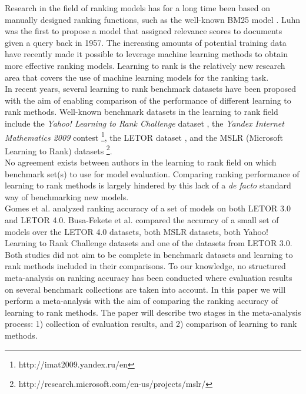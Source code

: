 \documentclass{sig-alternate-2013}
\begin{document}
Research in the field of ranking models has for a long time been based on manually designed ranking functions, such as the well-known BM25 model \cite{Robertson1994}. Luhn \cite{Luhn1957} was the first to propose a model that assigned relevance scores to documents given a query back in 1957. The increasing amounts of potential training data have recently made it possible to leverage machine learning methods to obtain more effective ranking models. Learning to rank is the relatively new research area that covers the use of machine learning models for the ranking task.\\

In recent years, several learning to rank benchmark datasets have been proposed with the aim of enabling comparison of the performance of different learning to rank methods. Well-known benchmark datasets in the learning to rank field include the \emph{Yahoo! Learning to Rank Challenge} dataset \cite{Chapelle2011a}, the \emph{Yandex Internet Mathematics 2009} contest \footnote{http://imat2009.yandex.ru/en}, the LETOR dataset \cite{Qin2010}, and the MSLR (Microsoft Learning to Rank) datasets \footnote{http://research.microsoft.com/en-us/projects/mslr/}.\\

No agreement exists between authors in the learning to rank field on which benchmark set(s) to use for model evaluation. Comparing ranking performance of learning to rank methods is largely hindered by this lack of a \emph{de facto} standard way of benchmarking new models.\\

Gomes et al. \cite{Gomes2013} analyzed ranking accuracy of a set of models on both LETOR 3.0 and LETOR 4.0. Busa-Fekete et al. \cite{Busa-Fekete2013} compared the accuracy of a small set of models over the LETOR 4.0 datasets, both MSLR datasets, both Yahoo! Learning to Rank Challenge datasets and one of the datasets from LETOR 3.0. Both studies did not aim to be complete in benchmark datasets and learning to rank methods included in their comparisons. To our knowledge, no structured meta-analysis on ranking accuracy has been conducted where evaluation results on several benchmark collections are taken into account. In this paper we will perform a meta-analysis with the aim of comparing the ranking accuracy of learning to rank methods. The paper will describe two stages in the meta-analysis process: 1) collection of evaluation results, and 2) comparison of learning to rank methods.
\end{document}
